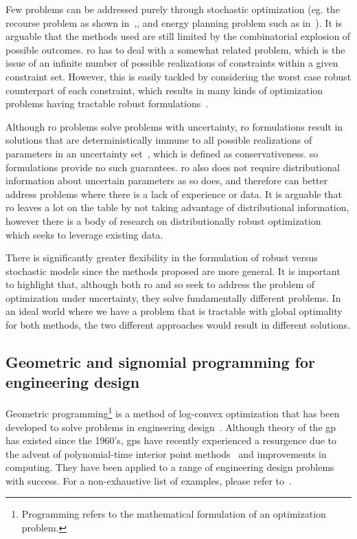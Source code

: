 Few problems can be addressed purely through stochastic optimization (eg. the recourse problem as
shown in~\cite{Kall1982},\cite{Higle1991}, and energy planning problem such as in~\cite{Pereira1991}).
It is arguable that the methods used are still limited by the combinatorial
explosion of possible outcomes. \gls{ro} has to deal with a somewhat related problem, which is the issue of an infinite number
of possible realizations of constraints within a given constraint set. However, this is easily
tackled by considering the worst case robust counterpart of each constraint, which
results in many kinds of optimization problems having tractable robust formulations~\cite{Bertsimas2011}.

Although \gls{ro} problems solve problems with uncertainty,
\gls{ro} formulations result in solutions that are deterministically immune
to all possible realizations of parameters in an uncertainty set~\cite{Bertsimas2011}, which is defined as conservativeness.
\gls{so} formulations
provide no such guarantees. \gls{ro} also does not require distributional information
about uncertain parameters as \gls{so} does, and therefore can better address problems where there
is a lack of experience or data. It is arguable that \gls{ro}
leaves a lot on the table by not taking advantage of distributional information,
however there is a body of research on distributionally robust optimization~\cite{Bertsimas2013}
which seeks to leverage existing data.

There is significantly greater flexibility in the formulation of robust versus stochastic models
since the methods proposed are more general. It is important to highlight that,
although both \gls{ro} and \gls{so} seek to address the problem
of optimization under uncertainty, they solve fundamentally different problems. In an ideal world where
we have a problem that is tractable with global optimality for both methods, the two different
approaches would result in different solutions.

\subsection{Geometric and signomial programming for engineering design}

Geometric programming\footnote{Programming refers to the mathematical formulation of an optimization problem.}
is a method of log-convex optimization that has been developed
to solve problems in engineering design~\cite{Duffin1967}. Although theory of the \gls{gp} has existed since
the 1960's, \gls{gp}s have recently experienced a resurgence due to the advent of polynomial-time
interior point methods~\cite{Nesterov1994} and improvements in computing. They have been
applied to a range of engineering design problems with success. For a non-exhaustive list of examples,
please refer to~\cite{Boyd2007}.

